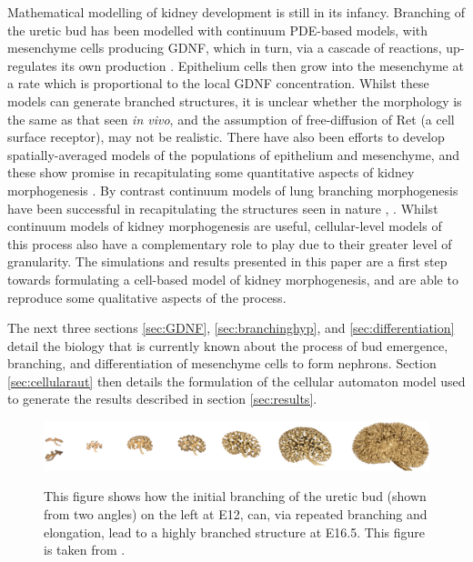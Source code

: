 \documentclass[pdftex,10pt,a4paper,twocolumn]{article}
\begin{document}
Mathematical modelling of kidney development is still in its infancy. Branching of the uretic bud has been modelled with continuum PDE-based models, with mesenchyme cells producing GDNF, which in turn, via a cascade of reactions, up-regulates its own production \cite{MenshykauDIber}. Epithelium cells then grow into the mesenchyme at a rate which is proportional to the local GDNF concentration. Whilst these models can generate branched structures, it is unclear whether the morphology is the same as that seen \textit{in vivo}, and the assumption of free-diffusion of Ret (a cell surface receptor), may not be realistic. There have also been efforts to develop spatially-averaged models of the populations of epithelium and mesenchyme, and these show promise in recapitulating some quantitative aspects of kidney morphogenesis \cite{vlad}. By contrast continuum models of lung branching morphogenesis have been successful in recapitulating the structures seen in nature \cite{HartmannDMiura}, \cite{miura2013modeling}. Whilst continuum models of kidney morphogenesis are useful, cellular-level models of this process also have a complementary role to play due to their greater level of granularity. The simulations and results presented in this paper are a first step towards formulating a cell-based model of kidney morphogenesis, and are able to reproduce some qualitative aspects of the process. 

The next three sections \ref{sec:GDNF}, \ref{sec:branchinghyp}, and \ref{sec:differentiation} detail the biology that is currently known about the process of bud emergence, branching, and differentiation of mesenchyme cells to form nephrons. Section \ref{sec:cellularaut} then details the formulation of the cellular automaton model used to generate the results described in section \ref{sec:results}. 

\begin{figure}[t] 
\centering
\scalebox{0.5} 
{\includegraphics{real-branching.eps}}
\caption{This figure shows how the initial branching of the uretic bud (shown from two angles) on the left at E12, can, via repeated branching and elongation, lead to a highly branched structure at E16.5. This figure is taken from \cite{short2014global}.}\label{fig:real-branching}
\end{figure} 
\end{document}
